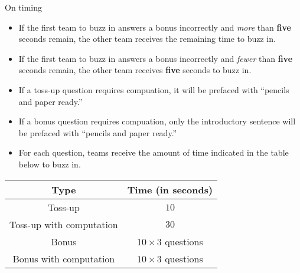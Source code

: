 \documentclass{report}
\begin{document}
\vspace*{0.3 cm}
On timing
\begin{itemize}
    \item If the first team to buzz in answers a bonus incorrectly and \textit{more} than \textbf{five} seconds remain, the other team receives the remaining time to buzz in.
    \item If the first team to buzz in answers a bonus incorrectly and \textit{fewer} than \textbf{five} seconds remain, the other team receives \textbf{five} seconds to buzz in.
    \item If a toss-up question requires compuation, it will be prefaced with ``pencils and paper ready.''
    \item If a bonus question requires compuation, only the introductory sentence will be prefaced with ``pencils and paper ready.''
    \item For each question, teams receive the amount of time indicated in the table below to buzz in.

\end{itemize}

\vspace*{\fill}

\begin{center}
\begin{tabular}{||c|c||} 
    \hline
    Type & Time (in seconds) \\
    \hline\hline
    Toss-up & $10$ \\ 
    \hline
    Toss-up with computation & $30$ \\ 
    \hline
    Bonus & $10\times 3$ questions \\ 
    \hline
    Bonus with computation & $10\times 3$ questions \\
    \hline
\end{tabular}
\end{center}
\end{document}
